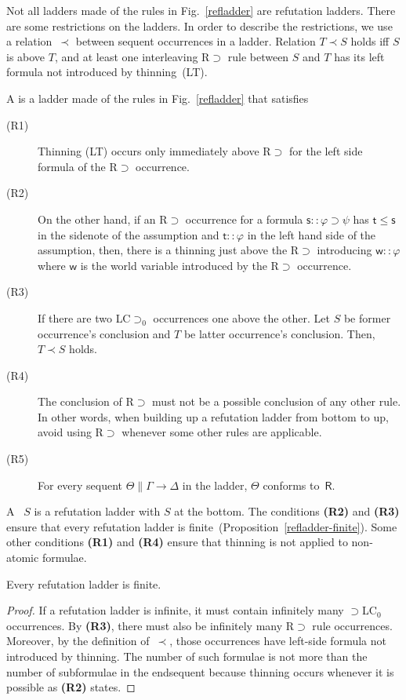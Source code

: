   Not all ladders made of the rules in Fig.~\ref{refladder} are
  refutation ladders.
  There are some restrictions on the ladders.
  In order to describe the restrictions,
  we use a relation~$\prec$ between sequent occurrences in a ladder.
  Relation $T\prec S$ holds iff
  $S$ is above $T$, and
  at least one interleaving \textrm{R$\supset$} rule between $S$ and $T$
  has its left formula not introduced by thinning~(LT).
  \begin{definition}
   A  is a ladder made of the rules in
   Fig.~\ref{refladder} that satisfies
   \begin{description}
    \item[ (R1)] Thinning \textrm{(LT)} occurs only immediately above \textrm{R$\supset$} for the
	 left side formula of the \textrm{R$\supset$} occurrence.
    \item[ (R2)]
	 On the other hand, if an \textrm{R$\supset$} occurrence
	 for a formula
	 $\mathsf s::\varphi\supset\psi$ has $\mathsf t\le \mathsf s$
	 in the sidenote of the assumption and
	 $\mathsf t::\varphi$ in the left hand side of the assumption,
	 then,
	 there is a thinning just above the R$\supset$ introducing
	 $\mathsf w::\varphi$ where $\mathsf w$ is the world variable
	 introduced by the \textrm{R$\supset$} occurrence.
    \item[ (R3)]
	 If there are two \textrm{LC$\supset_0$} occurrences one above the
	 other.
	 Let $S$ be former occurrence's conclusion and $T$ be latter occurrence's
	 conclusion.
	 Then, $T\prec S$ holds.
    \item[ (R4)]
	 The conclusion of \textrm{R$\supset$} must not be a
	 possible conclusion of any other rule.
	 In other words, when building up a refutation ladder from
	 bottom to up, avoid using R$\supset$ whenever some other
	 rules are applicable.
    \item[ (R5)]
	 For every sequent $\Theta\parallel \Gamma\rightarrow\Delta$
	 in the ladder, $\Theta$ conforms to~$\mathsf R$.
   \end{description}
  \end{definition}
  A ~$S$ is a refutation ladder
  with
  $S$ at the bottom.
  The conditions \textbf{(R2)} and \textbf{(R3)} ensure that every
  refutation ladder is finite~(Proposition~\ref{refladder-finite}).
  Some other conditions \textbf{(R1)} and \textbf{(R4)} ensure
  that thinning is not applied to non-atomic formulae.


  \begin{proposition}
   \label{refladder-finite}
   Every refutation ladder is finite.
  \end{proposition}
  \begin{proof}
   If a refutation ladder is infinite,
   it must contain infinitely many $\supset$LC$_0$ occurrences.
   By \textbf{(R3)}, there must also be infinitely many R$\supset$ rule
   occurrences.
   Moreover, by the definition of~$\prec$,
   those occurrences have left-side formula not
   introduced by thinning.
   The number of such formulae is not more than the number of subformulae
   in the endsequent because thinning occurs whenever it is possible as
   \textbf{(R2)} states.
  \end{proof}

